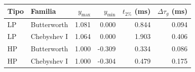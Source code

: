 \begin{tabular}{llrrrr}\toprule
Tipo & Familia & $y_{\max}$ & $y_{\min}$ & $t_{2\%}$ (ms) & $\Delta\tau_g$ (ms)\\\midrule
LP & Butterworth & 1.081 & 0.000 & 0.844 & 0.094 \\
LP & Chebyshev I & 1.064 & 0.000 & 1.903 & 0.406 \\
HP & Butterworth & 1.000 & -0.309 & 0.334 & 0.086 \\
HP & Chebyshev I & 1.000 & -0.304 & 0.479 & 0.175 \\
\bottomrule\end{tabular}